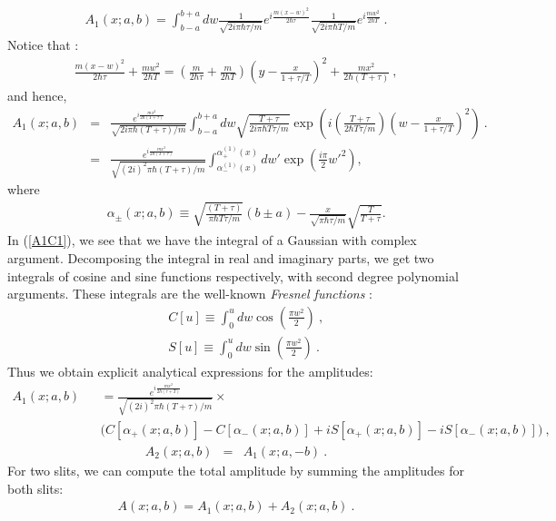 \documentclass[12pt,aps,prb,preprint]{revtex4-1}   %
\begin{document}
\begin{eqnarray}\label{A11}
A_1(x;a,b)=\int_{b-a}^{b+a} dw \frac{1}{\sqrt{2i\pi
\hbar\tau/m}}e^{i\frac{m (x-w)^2}{2\hbar\tau}}
\frac{1}{\sqrt{2i\pi \hbar T/m}}e^{i\frac{m w^2}{2\hbar T}}  \ .
\end{eqnarray}
Notice that :
\begin{eqnarray*}
\frac{m(x-w)^2}{2\hbar\tau}+\frac{mw^2}{2\hbar T}=
(\frac{m}{2\hbar\tau}+\frac{m}{2\hbar
T})(y-\frac{x}{1+\tau/T})^2 + \frac{mx^2}{2\hbar(T+\tau)}\ ,
\end{eqnarray*}
and hence,
\begin{eqnarray}\label{A1C1}
A_1(x;a,b)&=&\frac{e^{i\frac{mx^2}{2\hbar
(T+\tau)}}}{\sqrt{2i\pi \hbar (T+\tau)/m}}\int_{b-a}^{b+a} dw
\sqrt{\frac{T+\tau}{2i\pi \hbar
T\tau/m}}\exp{\left(i(\frac{T+\tau}{2\hbar
T\tau/m})(w-\frac{x}{1+\tau/T})^2\right)}  \ .
{}\nonumber\\{}&=&\frac{e^{i\frac{mx^2}{2\hbar
(T+\tau)}}}{\sqrt{(2i)^2\pi \hbar
(T+\tau)/m}}\int_{\alpha_{-}^{(1)}(x)}^{\alpha_{+}^{(1)}(x)} dw'
\exp{\left(\frac{i\pi}{2} w'^2\right)},
\end{eqnarray}
where
\begin{eqnarray}\label{alpha1}
&&\alpha_{\pm}(x;a,b)\equiv\sqrt{\frac{(T+\tau)}{\pi \hbar
T\tau/m}}(b\pm a)-\frac{x}{\sqrt{\pi
\hbar\tau/m}}\sqrt{\frac{T}{T+\tau}}.
\end{eqnarray}
In (\ref{A1C1}), we see that we have the integral of a Gaussian
with complex argument. Decomposing the integral in real and
imaginary parts, we get two integrals of cosine and sine functions
respectively, with second degree polynomial arguments. These
integrals are the well-known \textit{Fresnel functions}
\cite{Abramowitz}:
\begin{eqnarray*}
&& C[u]\equiv\int_0^u dw \cos{(\frac{\pi w^2}{2})}\ , {}\\{}&&
S[u]\equiv\int_0^u dw \sin{(\frac{\pi w^2}{2})}\ .
\end{eqnarray*}
Thus we obtain explicit analytical expressions for the amplitudes:
\begin{eqnarray}\label{A1C2}
 A_1(x;a,b)&&=\frac{e^{i\frac{m x^2}{2\hbar
(\tau+T)}}}{\sqrt{(2i)^2\pi \hbar (T+\tau)/m}} \times
{}\nonumber\\{}&&\big(C[\alpha_{+}(x;a,b)] - C[\alpha_{-}(x;a,b)] +
iS[\alpha_{+}(x;a,b)] - iS[\alpha_{-}(x;a,b)] \big)\ ,
\end{eqnarray}
\begin{eqnarray}\label{A2C2}
A_2(x;a,b)&=&A_1(x;a,-b)\ .
\end{eqnarray}
{For two slits, we can compute the total amplitude by summing the amplitudes for both slits:
\begin{eqnarray}\label{A}
A(x;a,b)=A_1(x;a,b)+A_2(x;a,b)\ .
\end{eqnarray}}
\end{document}
